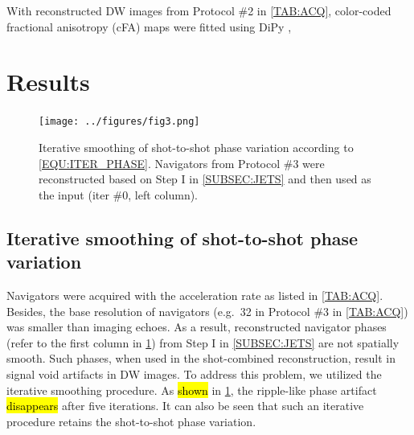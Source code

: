 \documentclass[preprint,12pt,authoryear,review]{elsarticle}
\begin{document}
    With reconstructed DW images from Protocol \#2 in \cref{TAB:ACQ},
    color-coded fractional anisotropy (cFA) maps
    \citep{basser_1994_dmri} were fitted using DiPy \citep{garyfallidis_2014_dipy},

    \pagebreak

    \section{Results}
    \label{SEC_Resl}


    \begin{figure}
        \centering
        \texttt{[image: ../figures/fig3.png]}
        \caption{Iterative smoothing of shot-to-shot phase variation
        according to \cref{EQU:ITER_PHASE}.
        Navigators from Protocol \#3 were reconstructed
        based on Step I in \cref{SUBSEC:JETS}
        and then used as the input (iter \#0, left column).}
        \label{FIG:iter_phase}
    \end{figure}

    \subsection{Iterative smoothing of shot-to-shot phase variation}

    Navigators were acquired with the acceleration rate
    as listed in \cref{TAB:ACQ}.
    Besides, the base resolution of navigators
    (e.g.~32 in Protocol \#3 in \cref{TAB:ACQ})
    was smaller than imaging echoes.
    As a result, reconstructed navigator phases
    (refer to the first column in \cref{FIG:iter_phase})
    from Step I in \cref{SUBSEC:JETS}
    are not spatially smooth.
    Such phases, when used in the shot-combined reconstruction,
    result in signal void artifacts in DW images.
    To address this problem, we utilized the iterative smoothing procedure.
    As \hl{shown} in \cref{FIG:iter_phase},
    the ripple-like phase artifact \hl{disappears} after five iterations.
    It can also be seen that such an iterative procedure retains
    the shot-to-shot phase variation.
\end{document}
